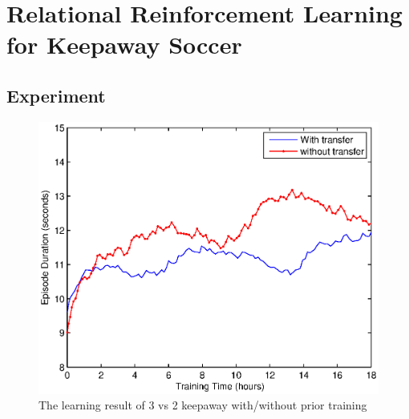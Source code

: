 
\chapter{Relational Reinforcement Learning for Keepaway Soccer}


\section{Experiment}

\begin{figure}[h]
    \centering
    \begin{minipage}[t]{0.6\linewidth}
        \centering
        \includegraphics[width=\textwidth] {./figures/3vs2transfer.eps}
        \caption{The learning result of 3 vs 2 keepaway with/without prior training}
    \label{fig:3vs2transfer}
    \end{minipage}
\end{figure}

